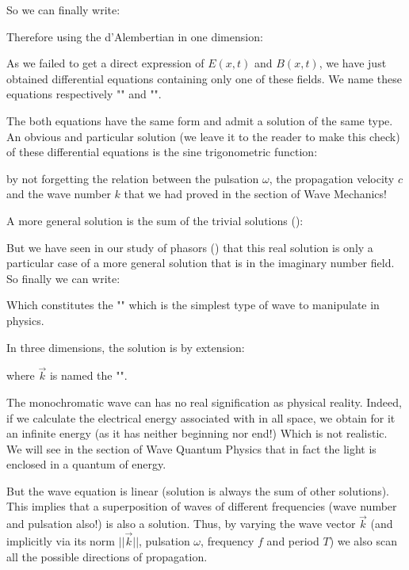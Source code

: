 	So we can finally write:
	
	Therefore using the d'Alembertian in one dimension:
	
	As we failed to get a direct expression of $E(x, t)$ and $B (x, t)$, we have just obtained differential equations containing only one of these fields. We name these equations respectively "" and "".

	The both equations have the same form and admit a solution of the same type. An obvious and particular solution (we leave it to the reader to make this check) of these differential equations is the sine trigonometric function:
	
	by not forgetting the relation between the pulsation $\omega$, the propagation velocity $c$ and the wave number $k$ that we had proved in the section of Wave Mechanics!

	A more general solution is the sum of the trivial solutions ():
	
	But we have seen in our study of phasors () that this real solution is only a particular case of a more general solution that is in the imaginary number field. So finally we can write:
	
	Which constitutes the "\label{monochromatic plane wave}" which is the simplest type of wave to manipulate in physics.

	In three dimensions, the solution is by extension:
	
	where $\vec{k}$ is named the "".
	\begin{tcolorbox}[title=Remark,colframe=black,arc=10pt]
	The monochromatic wave can has no real signification as physical reality. Indeed, if we calculate the electrical energy associated with in all space, we obtain for it an infinite energy (as it has neither beginning nor end!) Which is not realistic. We will see in the section of Wave Quantum Physics that in fact the light is enclosed in a quantum of energy.
	\end{tcolorbox}
	But the wave equation is linear (solution is always the sum of other solutions). This implies that a superposition of waves of different frequencies (wave number and pulsation also!) is also a solution. Thus, by varying the wave vector $\vec{k}$ (and implicitly via its norm $||\vec{k}||$, pulsation $\omega$, frequency $f$ and period $T$) we also scan all the possible directions of propagation.

